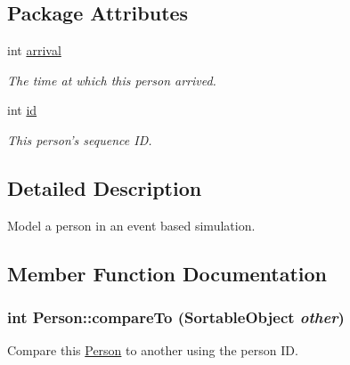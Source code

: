 \subsection*{Package Attributes}
\begin{CompactItemize}
\item 
\hypertarget{class_person_bcad6c190949170c19df773b5b2757ac}{
int \hyperlink{class_person_bcad6c190949170c19df773b5b2757ac}{arrival}}
\label{class_person_bcad6c190949170c19df773b5b2757ac}

\begin{CompactList}\small\item\em The time at which this person arrived. \item\end{CompactList}\item 
\hypertarget{class_person_ec48a92f614a854ff380a15eb8e2f479}{
int \hyperlink{class_person_ec48a92f614a854ff380a15eb8e2f479}{id}}
\label{class_person_ec48a92f614a854ff380a15eb8e2f479}

\begin{CompactList}\small\item\em This person's sequence ID. \item\end{CompactList}\end{CompactItemize}


\subsection{Detailed Description}
Model a person in an event based simulation. 

\subsection{Member Function Documentation}
\hypertarget{class_person_7cf242bfd4f0bfac0d7baec9dc420c7d}{
\subsubsection[{compareTo}]{\setlength{\rightskip}{0pt plus 5cm}int Person::compareTo ({\bf SortableObject} {\em other})}}
\label{class_person_7cf242bfd4f0bfac0d7baec9dc420c7d}


Compare this \hyperlink{class_person}{Person} to another using the person ID. 

